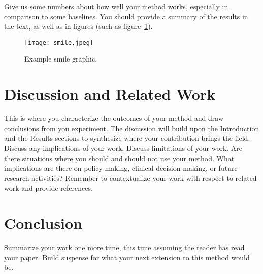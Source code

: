 \documentclass[twoside,11pt]{article}
\begin{document}
Give us some numbers about how well your method works, especially in comparison to some baselines.
You should provide a summary of the results in the text, as well as in figures (such as figure~\ref{fig:example}).  


\begin{figure}[htbp]
  \centering 
  \texttt{[image: smile.jpeg]} 
  \caption{Example smile graphic.}
  \label{fig:example} 
\end{figure} 

\section{Discussion and Related Work} 

This is where you characterize the outcomes of your method and draw conclusions from you experiment.
The discussion will build upon the Introduction and the Results sections to synthesize where your contribution brings the field. Discuss any implications of your work. 
Discuss limitations of your work.
Are there situations where you should and should not use your method.
What implications are there on policy making, clinical decision making, or future research activities?
Remember to contextualize your work with respect to related work and provide references.

\section{Conclusion} 
Summarize your work one more time, this time assuming the reader has read your paper.
Build suspense for what your next extension to this method would be.

\end{document}
